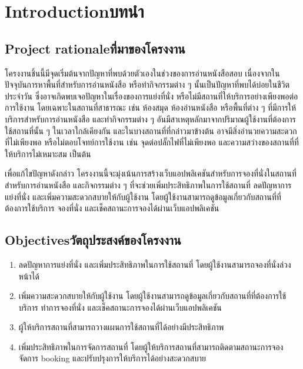 \chapter{\ifenglish Introduction\else บทนำ\fi}

\section{\ifenglish Project rationale\else ที่มาของโครงงาน\fi}
โครงงานชิ้นนี้มีจุดเริ่มต้นจากปัญหาที่พบด้วยตัวเองในช่วงของการอ่านหนังสือสอบ เนื่องจากในปัจจุบันการหาพื้นที่สำหรับการอ่านหนังสือ หรือทำกิจกรรมต่าง ๆ นั้นเป็นปัญหาที่พบได้บ่อยในชีวิตประจำวัน ซึ่งอาจเกิดพบเจอปัญหาในเรื่องของการแย่งที่นั่ง หรือไม่มีสถานที่ให้บริการอย่างเพียงพอต่อการใช้งาน โดยเฉพาะในสถานที่สาธารณะ เช่น ห้องสมุด ห้องอ่านหนังสือ หรือพื้นที่ต่าง ๆ ที่มีการให้บริการสำหรับการอ่านหนังสือ และทำกิจกรรมต่าง ๆ อันมีสาเหตุหลักมาจากปริมาณผู้ใช้งานที่ต้องการใช้สถานที่นั้น ๆ ในเวลาใกล้เคียงกัน และในบางสถานที่ที่กล่าวมาข้างต้น อาจมีสิ่งอำนวยความสะดวกที่ไม่เพียงพอ หรือไม่ตอบโจทย์การใช้งาน เช่น จุดต่อปลั๊กไฟที่ไม่เพียงพอ และความสว่างของสถานที่ที่ให้บริการไม่เหมาะสม เป็นต้น

เพื่อแก้ไขปัญหาดังกล่าว โครงงานนี้จะมุ่งเน้นการสร้างเว็บแอปพลิเคชันสำหรับการจองที่นั่งในสถานที่สำหรับการอ่านหนังสือ และกิจกรรมต่าง ๆ ที่จะช่วยเพิ่มประสิทธิภาพในการใช้สถานที่ ลดปัญหาการแย่งที่นั่ง และเพิ่มความสะดวกสบายให้กับผู้ใช้งาน โดยผู้ใช้งานสามารถดูข้อมูลเกี่ยวกับสถานที่ที่ต้องการใช้บริการ จองที่นั่ง และเช็คสถานะการจองได้ผ่านเว็บแอปพลิเคชัน

\section{\ifenglish Objectives\else วัตถุประสงค์ของโครงงาน\fi}
\begin{enumerate}
    \item ลดปัญหาการแย่งที่นั่ง และเพิ่มประสิทธิภาพในการใช้สถานที่ โดยผู้ใช้งานสามารถจองที่นั่งล่วงหน้าได้ 
    \item เพิ่มความสะดวกสบายให้กับผู้ใช้งาน โดยผู้ใช้งานสามารถดูข้อมูลเกี่ยวกับสถานที่ที่ต้องการใช้บริการ ทำการจองที่นั่ง และเช็คสถานะการจองได้ผ่านเว็บแอปพลิเคชัน
    \item ผู้ให้บริการสถานที่สามารถวางแผนการใช้สถานที่ได้อย่างมีประสิทธิภาพ
    \item เพิ่มประสิทธิภาพในการจัดการสถานที่ โดยผู้ให้บริการสถานที่สามารถติดตามสถานะการจอง จัดการ booking และปรับปรุงการให้บริการได้อย่างสะดวกสบาย
\end{enumerate}

